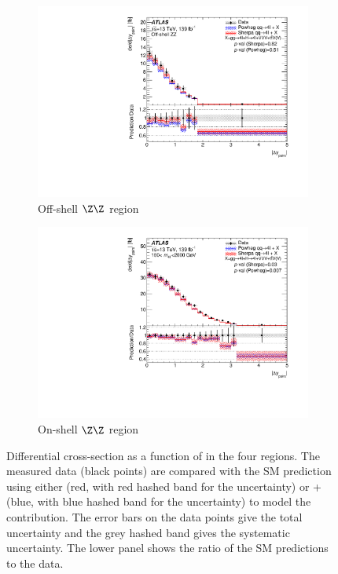 \begin{figure}[htb!]
\begin{subfigure}{.49\textwidth}
      \includegraphics[width=.99\linewidth]{Figures/m4l/UnfoldedResults/linY_Unfolded_Data_deltaYPairs_m4loffshell.pdf}  \caption{Off-shell $\Z\Z$ region}\label{fig:sub-third}
    \end{subfigure}
    \begin{subfigure}{.49\textwidth}\centering
      \includegraphics[width=.99\linewidth]{Figures/m4l/UnfoldedResults/linY_Unfolded_Data_deltaYPairs_m4l180-2000.pdf}  \caption{On-shell $\Z\Z$ region}\label{fig:sub-fourth}
    \end{subfigure}
    \caption{Differential cross-section as a function of \dYPairs{} in the four
        \mFourL{} regions. The measured data (black points) are  compared with the SM prediction using either \SHERPA{} (red, with red hashed band for the uncertainty) or \POWHEG{} + \pythia{} (blue, with blue hashed band for the uncertainty) to model the \qqFourL{} contribution. The error bars on the data points give the total uncertainty and the grey hashed band gives the systematic uncertainty. \Pvalue{} The  lower panel shows the ratio of the SM predictions to the data.}
    \label{fig:dYPairs_m4l}
\end{figure}
